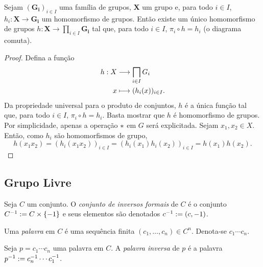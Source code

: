 \begin{prop}
Sejam $(\bm{G_i})_{i \in I}$ uma família de grupos, $\bm X$ um grupo e, para todo $i \in I$, $h_i: \bm X \to \bm{G_i}$ um homomorfismo de grupos. Então existe um único homomorfismo de grupos $h: \bm X \to \prod_{i \in I} \bm{G_i}$ tal que, para todo $i \in I$, $\pi_i \circ h = h_i$ (o diagrama comuta).
\begin{figure}
\centering
{}
\end{figure}
\end{prop}
\begin{proof}
Defina a função
	\begin{align*}
	\func{h}{X}{\prod_{i \in I} G_i}{x}{(h_i(x))_{i \in I}}.
	\end{align*}
Da propriedade universal para o produto de conjuntos, $h$ é a única função tal que, para todo $i \in I$, $\pi_i \circ h = h_i$. Basta mostrar que $h$ é homomorfismo de grupos. Por simplicidade, apenas a operação $\ast$ em $G$ será explicitada. Sejam $x_1,x_2 \in X$. Então, como $h_i$ são homomorfismos de grupo,
	\begin{equation*}
	h(x_1x_2) = (h_i(x_1x_2))_{i \in I} = (h_i(x_1)h_i(x_2))_{i \in I} = h(x_1)h(x_2).
	\end{equation*}
\end{proof}

\subsection{Grupo Livre}

\begin{defi}
Seja $C$ um conjunto. O \emph{conjunto de inversos formais} de $C$ é o conjunto $C^{-1} := C \times \{-1\}$ e seus elementos são denotados $c^{-1} := (c,-1)$.

Uma \emph{palavra} em $C$ é uma sequência finita $(c_1,\ldots,c_n) \in C^n$. Denota-se $c_1 \cdots c_n$.
\end{defi}

Seja $p=c_1 \cdots c_n$ uma palavra em $C$. A \emph{palavra inversa} de $p$ é a palavra $p^{-1} := c_n^{-1} \cdots c_1^{-1}$.

